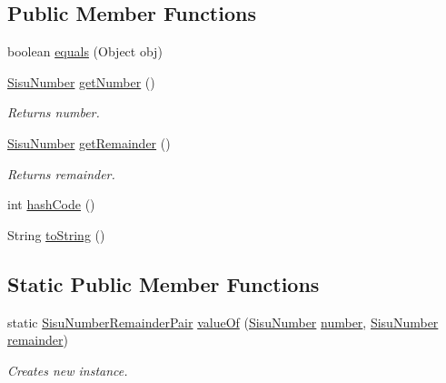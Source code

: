 \subsection*{Public Member Functions}
\begin{DoxyCompactItemize}
\item 
boolean \hyperlink{classcom_1_1aarrelaakso_1_1drawl_1_1_sisu_number_remainder_pair_aa598b72541b1daf3266960f97e0679d8}{equals} (Object obj)
\item 
\hyperlink{classcom_1_1aarrelaakso_1_1drawl_1_1_sisu_number}{Sisu\+Number} \hyperlink{classcom_1_1aarrelaakso_1_1drawl_1_1_sisu_number_remainder_pair_a0811842d4cf4746c09c81fca090f98e1}{get\+Number} ()
\begin{DoxyCompactList}\small\item\em Returns number. \end{DoxyCompactList}\item 
\hyperlink{classcom_1_1aarrelaakso_1_1drawl_1_1_sisu_number}{Sisu\+Number} \hyperlink{classcom_1_1aarrelaakso_1_1drawl_1_1_sisu_number_remainder_pair_a2fb5bd3f444211337da3ce927b821c56}{get\+Remainder} ()
\begin{DoxyCompactList}\small\item\em Returns remainder. \end{DoxyCompactList}\item 
int \hyperlink{classcom_1_1aarrelaakso_1_1drawl_1_1_sisu_number_remainder_pair_a1cb5209ed6a95a1337fea5f4c9709b33}{hash\+Code} ()
\item 
String \hyperlink{classcom_1_1aarrelaakso_1_1drawl_1_1_sisu_number_remainder_pair_a0468d2a2b1f5db91a39390dbc18de7a8}{to\+String} ()
\end{DoxyCompactItemize}
\subsection*{Static Public Member Functions}
\begin{DoxyCompactItemize}
\item 
static \hyperlink{classcom_1_1aarrelaakso_1_1drawl_1_1_sisu_number_remainder_pair}{Sisu\+Number\+Remainder\+Pair} \hyperlink{classcom_1_1aarrelaakso_1_1drawl_1_1_sisu_number_remainder_pair_a0476450adb6576d6a9143740b83fdcf9}{value\+Of} (\hyperlink{classcom_1_1aarrelaakso_1_1drawl_1_1_sisu_number}{Sisu\+Number} \hyperlink{classcom_1_1aarrelaakso_1_1drawl_1_1_sisu_number_remainder_pair_a7ff7c95e41cb9dfbccb419fc75d05706}{number}, \hyperlink{classcom_1_1aarrelaakso_1_1drawl_1_1_sisu_number}{Sisu\+Number} \hyperlink{classcom_1_1aarrelaakso_1_1drawl_1_1_sisu_number_remainder_pair_a2db9bc3ff60d0078b3341f75dd830890}{remainder})
\begin{DoxyCompactList}\small\item\em Creates new instance. \end{DoxyCompactList}\end{DoxyCompactItemize}
